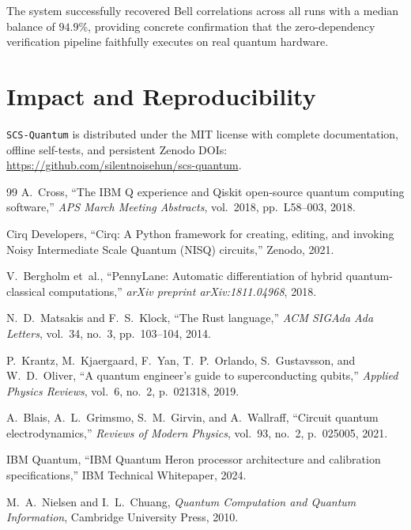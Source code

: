 \documentclass[11pt,a4paper]{article}
\begin{document}
The system successfully recovered Bell correlations across all runs with a median balance of $94.9\%$, providing concrete confirmation that the zero-dependency verification pipeline faithfully executes on real quantum hardware.

\section{Impact and Reproducibility}
\texttt{SCS-Quantum} is distributed under the MIT license with complete documentation, offline self-tests, and persistent Zenodo DOIs: \url{https://github.com/silentnoisehun/scs-quantum}.


\begin{thebibliography}{99}
A.~Cross,
``The IBM Q experience and Qiskit open-source quantum computing software,''
\emph{APS March Meeting Abstracts}, vol.~2018, pp.~L58--003, 2018.

Cirq Developers,
``Cirq: A Python framework for creating, editing, and invoking Noisy Intermediate Scale Quantum (NISQ) circuits,''
Zenodo, 2021.

V.~Bergholm et~al.,
``PennyLane: Automatic differentiation of hybrid quantum-classical computations,''
\emph{arXiv preprint arXiv:1811.04968}, 2018.

N.~D.~Matsakis and F.~S.~Klock,
``The Rust language,''
\emph{ACM SIGAda Ada Letters}, vol.~34, no.~3, pp.~103--104, 2014.

P.~Krantz, M.~Kjaergaard, F.~Yan, T.~P.~Orlando, S.~Gustavsson, and W.~D.~Oliver,
``A quantum engineer's guide to superconducting qubits,''
\emph{Applied Physics Reviews}, vol.~6, no.~2, p.~021318, 2019.

A.~Blais, A.~L.~Grimsmo, S.~M.~Girvin, and A.~Wallraff,
``Circuit quantum electrodynamics,''
\emph{Reviews of Modern Physics}, vol.~93, no.~2, p.~025005, 2021.

IBM Quantum,
``IBM Quantum Heron processor architecture and calibration specifications,''
IBM Technical Whitepaper, 2024.

M.~A.~Nielsen and I.~L.~Chuang,
\emph{Quantum Computation and Quantum Information},
Cambridge University Press, 2010.
\end{thebibliography}
\end{document}
